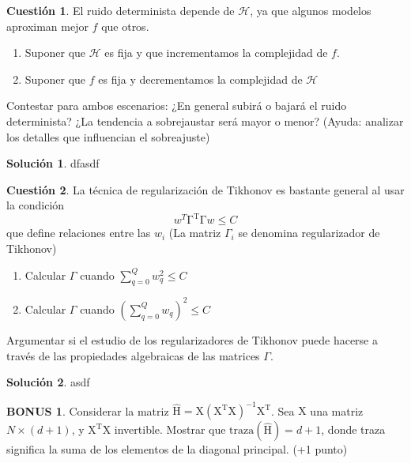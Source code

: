 \documentclass[a4paper, 11pt]{article}
\theoremstyle{definition}
\newtheorem{cuestion}{Cuestión}
\newtheorem*{solucion}{Solución}
\newtheorem*{bonus}{BONUS}
\begin{document}
  \begin{cuestion}
    El ruido determinista depende de $\mathcal{H}$, ya que algunos modelos aproximan mejor $f$ que otros.
    \begin{enumerate}
        \item Suponer que $\mathcal{H}$ es fija y que incrementamos la complejidad de $f$.
        \item Suponer que $ f$ es fija y decrementamos la complejidad de $\mathcal{H}$
    \end{enumerate}
    Contestar para ambos escenarios: ¿En general subirá o bajará el ruido determinista? ¿La tendencia a sobrejaustar será mayor o menor? (Ayuda: analizar los detalles que influencian el sobreajuste)
  \end{cuestion}

  \begin{solucion}
    dfasdf
  \end{solucion}


  \begin{cuestion}
    La técnica de regularización de Tikhonov es bastante general al usar la condición
    \[
    w^T\mathrm{\Gamma^T\Gamma}w\leq C
    \]
    que define relaciones entre las $w_i$ (La matriz $\Gamma_i$ se denomina regularizador de Tikhonov)
    \begin{enumerate}
    \item Calcular $\Gamma$ cuando $\sum_{q=0}^Q w_q^2 \leq C$
    \item Calcular $\Gamma$ cuando $(\sum_{q=0}^Q w_q)^2 \leq C$
    \end{enumerate}
    Argumentar si el estudio de los regularizadores de Tikhonov puede hacerse a través de las propiedades algebraicas de las matrices $\Gamma$.
  \end{cuestion}

  \begin{solucion}
    asdf
  \end{solucion}

  \begin{bonus}
    Considerar la matriz $\hat{\mathrm{H}}=\mathrm{X(X^TX)^{-1}X^T}$. Sea $\mathrm{X}$ una matriz  $N\times (d+1)$, y $\mathrm{X^TX}$ invertible. Mostrar que $\mathrm{traza(\hat{H})}=d+1$, donde traza significa la suma de los elementos de la diagonal principal. (+1 punto)
  \end{bonus}
\end{document}
